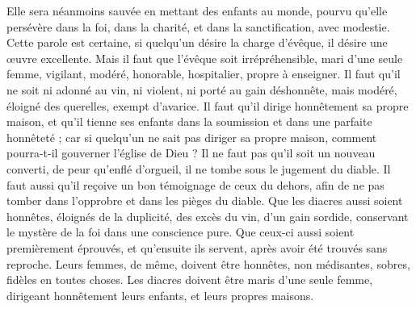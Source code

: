 \begin{multicols}{2}
Elle sera néanmoins sauvée en mettant des enfants au monde, pourvu qu'elle persévère dans la foi, dans la charité, et dans la sanctification, avec modestie.
\VerseOne{}Cette parole est certaine, si quelqu'un désire la charge d'évêque, il désire une œuvre excellente.
Mais il faut que l'évêque soit irrépréhensible, mari d'une seule femme, vigilant, modéré, honorable, hospitalier, propre à enseigner.
Il faut qu'il ne soit ni adonné au vin, ni violent, ni porté au gain déshonnête, mais modéré, éloigné des querelles, exempt d'avarice.
Il faut qu'il dirige honnêtement sa propre maison, et qu'il tienne ses enfants dans la soumission et dans une parfaite honnêteté ;
car si quelqu'un ne sait pas diriger sa propre maison, comment pourra-t-il gouverner l'église de Dieu ?
Il ne faut pas qu'il soit un nouveau converti, de peur qu'enflé d'orgueil, il ne tombe sous le jugement du diable.
Il faut aussi qu'il reçoive un bon témoignage de ceux du dehors, afin de ne pas tomber dans l'opprobre et dans les pièges du diable.
Que les diacres aussi soient honnêtes, éloignés de la duplicité, des excès du vin, d'un gain sordide,
conservant le mystère de la foi dans une conscience pure.
Que ceux-ci aussi soient premièrement éprouvés, et qu’ensuite ils servent, après avoir été trouvés sans reproche.
Leurs femmes, de même, doivent être honnêtes, non médisantes, sobres, fidèles en toutes choses.
Les diacres doivent être maris d'une seule femme, dirigeant honnêtement leurs enfants, et leurs propres maisons.

\end{multicols}
